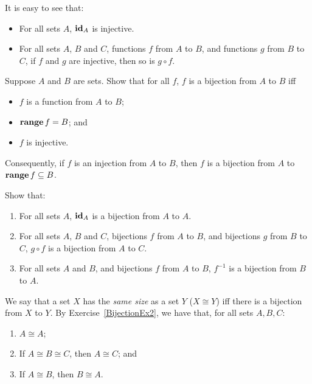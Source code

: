 It is easy to see that:
\begin{itemize}
\item For all sets $A$, $\mathbf{id}_A$ is injective.

\item For all sets $A$, $B$ and $C$, functions $f$ from $A$ to $B$,
and functions $g$ from $B$ to $C$, if $f$ and $g$ are injective,
then so is $g\circ f$.
\end{itemize}

\begin{exercise}
\label{BijectionEx1}
Suppose $A$ and $B$ are sets.  Show that for all $f$,
$f$ is a bijection from $A$ to $B$ iff
\begin{itemize}
\item $f$ is a function from $A$ to $B$;

\item $\mathbf{range}\,f = B$; and

\item $f$ is injective.
\end{itemize}
\end{exercise}

Consequently, if $f$ is an injection from $A$ to $B$, then $f$ is
a bijection from $A$ to $\mathbf{range}\,f\subseteq B$.

\begin{exercise}
\label{BijectionEx2}
Show that:
\begin{enumerate}[\quad(1)]
\item For all sets $A$, $\mathbf{id}_A$ is a bijection from $A$ to $A$.

\item For all sets $A$, $B$ and $C$, bijections $f$ from $A$ to $B$,
and bijections $g$ from $B$ to $C$, $g\circ f$ is a bijection from $A$ to $C$.

\item For all sets $A$ and $B$, and bijections $f$ from $A$ to $B$,
$f^{-1}$ is a bijection from $B$ to $A$.
\end{enumerate}
\end{exercise}

We say that a set $X$ has the \emph{same size} as a set $Y$
%
%
($X\cong Y$)
%
%
iff there is a bijection from $X$ to $Y$.  By Exercise~\ref{BijectionEx2},
we have that, for all sets $A,B,C$:
\begin{enumerate}[\quad (1)]
\item $A\cong A$;

\item If $A\cong B\cong C$, then $A\cong C$; and

\item If $A\cong B$, then $B\cong A$.
\end{enumerate}

